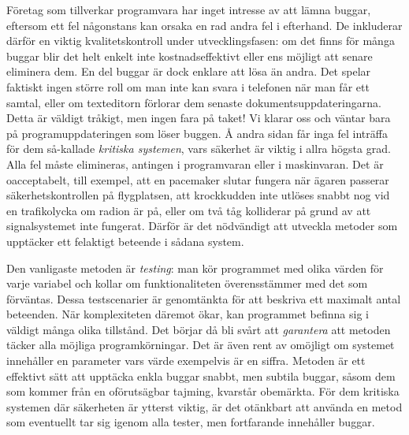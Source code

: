 Företag som tillverkar programvara har inget intresse av att lämna
buggar, eftersom ett fel någonstans kan orsaka en rad andra fel i
efterhand. %
%
De inkluderar därför en viktig kvalitetskontroll under
utvecklingsfasen: om det finns för många buggar blir det helt enkelt
inte kostnadseffektivt eller ens möjligt att senare eliminera dem.
%
En del buggar är dock enklare att lösa än andra.
%
Det spelar faktiskt ingen större roll om man inte kan svara i
telefonen när man får ett samtal, eller om texteditorn förlorar dem
senaste dokumentsuppdateringarna.
%
Detta är väldigt tråkigt, men ingen fara på taket! Vi klarar oss och
väntar bara på programuppdateringen som löser buggen.
%
Å andra sidan får inga fel inträffa för dem så-kallade %
\emph{kritiska systemen}, vars säkerhet är viktig i allra högsta
grad. Alla fel måste elimineras, antingen i programvaran eller i
maskinvaran.
%
Det är oacceptabelt, till exempel, att en pacemaker slutar fungera när
ägaren passerar säkerhetskontrollen på flygplatsen, att krockkudden
inte utlöses snabbt nog vid en trafikolycka om radion är på, eller om
två tåg kolliderar på grund av att signalsystemet inte fungerat.
%
Därför är det nödvändigt att utveckla metoder som upptäcker
ett felaktigt beteende i sådana system.


Den vanligaste metoden är \emph{testing}: man kör programmet med olika
värden för varje variabel och kollar om funktionaliteten
överensstämmer med det som förväntas.
%
Dessa testscenarier är genomtänkta för att beskriva ett maximalt antal
beteenden.
%
När komplexiteten däremot ökar, kan programmet befinna sig i väldigt
många olika tillstånd. Det börjar då bli svårt att \emph{garantera}
att metoden täcker alla möjliga programkörningar.
%
Det är även rent av omöjligt om systemet innehåller en parameter vars
värde exempelvis är en siffra.
%
Metoden är ett effektivt sätt att upptäcka enkla buggar snabbt, men
subtila buggar, såsom dem som kommer från en oförutsägbar tajming,
kvarstår obemärkta.
%
För dem kritiska systemen där säkerheten är ytterst viktig, är det
otänkbart att använda en metod som eventuellt tar sig igenom alla
tester, men fortfarande innehåller buggar.

